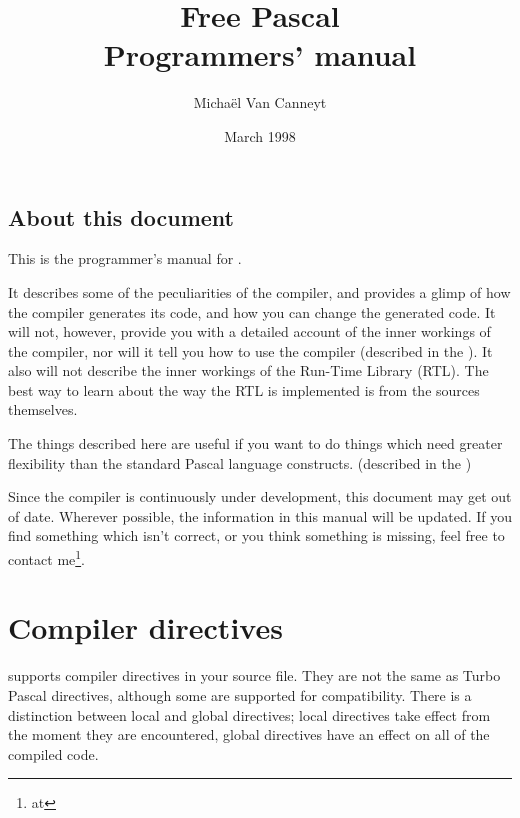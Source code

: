 \documentclass{report}
\begin{document}
\title{Free Pascal \\ Programmers' manual}
\date{March 1998}
\author{Micha\"el Van Canneyt}
\maketitle
\tableofcontents
\newpage

\section*{About this document}
This is the programmer's manual for \fpc.

It describes some of the peculiarities of the \fpc compiler, and provides a
glimp of how the compiler generates its code, and how you can change the
generated code. It will not, however, provide you with a detailed account of
the inner workings of the compiler, nor will it tell you how to use the
compiler (described in the \userref). It also will not describe the inner
workings of the Run-Time Library (RTL). The best way to learn about the way
the RTL is implemented is from the sources themselves. 

The things described here are useful if you want to do things which need
greater flexibility than the standard Pascal language constructs. 
(described in the )

Since the compiler is continuously under development, this document may get
out of date. Wherever possible, the information in this manual will be
updated. If you find something which isn't correct, or you think something
 is missing, feel free to contact me\footnote{at
}.

\chapter{Compiler directives}
\label{ch:CompSwitch}
\fpc supports compiler directives in your source file. They are not the same
as Turbo Pascal directives, although some are supported for compatibility.
There is a distinction between local and global directives; local directives
take effect from the moment they are encountered, global directives have an
effect on all of the compiled code.
\end{document}
